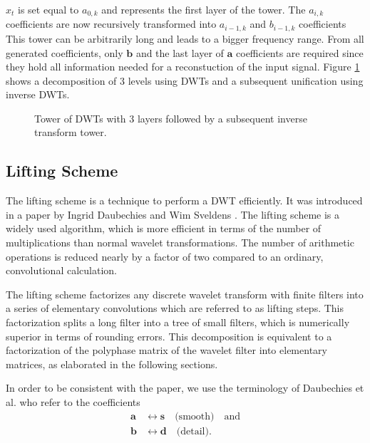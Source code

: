 \begin{refsection}
$x_t$ is set equal to $a_{0,k}$ and represents the first layer of the tower.
The $a_{i,k}$ coefficients are now recursively transformed into $a_{i-1,k}$ and $b_{i-1,k}$ coefficients
This tower can be arbitrarily long and leads to a bigger frequency range.
From all generated coefficients, only $\bm b$ and the last layer of $\bm a$ coefficients are required since they hold all information needed for a reconstuction of the input signal.
Figure \ref{fpga:fig:dwtTower} shows a decomposition of 3 levels using DWTs and a subsequent unification using inverse DWTs.
\begin{figure}
	\centering
	
	\caption{Tower of DWTs with 3 layers followed by a subsequent inverse transform tower.}
	\label{fpga:fig:dwtTower}
\end{figure}

\subsection{Lifting Scheme}

The lifting scheme is a technique to perform a DWT efficiently.
It was introduced in a paper by Ingrid Daubechies and Wim Sveldens \cite{fpga:Daubechies1998}. 
The lifting scheme is a widely used algorithm, which is more efficient in terms of the number of multiplications than normal wavelet transformations.
The number of arithmetic operations is reduced nearly by a factor of two compared to an ordinary, convolutional calculation.

The lifting scheme factorizes any discrete wavelet transform with finite filters into a series of elementary convolutions which are referred to as lifting steps.
This factorization splits a long filter into a tree of small filters, which is numerically superior in terms of rounding errors.
This decomposition is equivalent to a factorization of the polyphase matrix of the wavelet filter into elementary matrices, as elaborated in the following sections.

In order to be consistent with the paper, we use the terminology of Daubechies et al. who refer to the coefficients
\begin{align}
\bm a & \leftrightarrow \bm s \quad \text{(smooth)} \quad \text{and} \\
\bm b & \leftrightarrow \bm d \quad \text{(detail)} .
\end{align}


\end{refsection}
